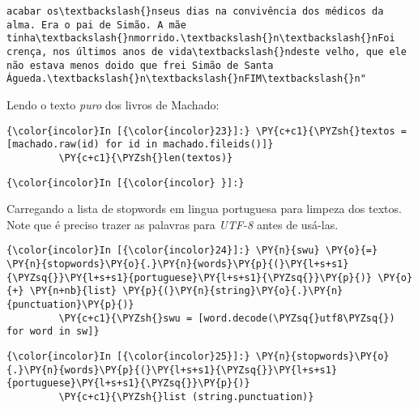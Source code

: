 \begin{Verbatim}[commandchars=\\\{\}]
acabar os\textbackslash{}nseus dias na convivência dos médicos da alma. Era o pai de Simão. A mãe tinha\textbackslash{}nmorrido.\textbackslash{}n\textbackslash{}nFoi crença, nos últimos anos de vida\textbackslash{}ndeste velho, que ele não estava menos doido que frei Simão de Santa Águeda.\textbackslash{}n\textbackslash{}nFIM\textbackslash{}n"
\end{Verbatim}
        
    Lendo o texto \emph{puro} dos livros de Machado:

    \begin{Verbatim}[commandchars=\\\{\}]
{\color{incolor}In [{\color{incolor}23}]:} \PY{c+c1}{\PYZsh{}textos = [machado.raw(id) for id in machado.fileids()]}
         \PY{c+c1}{\PYZsh{}len(textos)}
\end{Verbatim}

    \begin{Verbatim}[commandchars=\\\{\}]
{\color{incolor}In [{\color{incolor} }]:} 
\end{Verbatim}

    Carregando a lista de stopwords em lingua portuguesa para limpeza dos
textos. Note que é preciso trazer as palavras para \emph{UTF-8} antes de
usá-las.

    \begin{Verbatim}[commandchars=\\\{\}]
{\color{incolor}In [{\color{incolor}24}]:} \PY{n}{swu} \PY{o}{=} \PY{n}{stopwords}\PY{o}{.}\PY{n}{words}\PY{p}{(}\PY{l+s+s1}{\PYZsq{}}\PY{l+s+s1}{portuguese}\PY{l+s+s1}{\PYZsq{}}\PY{p}{)} \PY{o}{+} \PY{n+nb}{list} \PY{p}{(}\PY{n}{string}\PY{o}{.}\PY{n}{punctuation}\PY{p}{)}
         \PY{c+c1}{\PYZsh{}swu = [word.decode(\PYZsq{}utf8\PYZsq{}) for word in sw]}
\end{Verbatim}

    \begin{Verbatim}[commandchars=\\\{\}]
{\color{incolor}In [{\color{incolor}25}]:} \PY{n}{stopwords}\PY{o}{.}\PY{n}{words}\PY{p}{(}\PY{l+s+s1}{\PYZsq{}}\PY{l+s+s1}{portuguese}\PY{l+s+s1}{\PYZsq{}}\PY{p}{)}
         \PY{c+c1}{\PYZsh{}list (string.punctuation)}
\end{Verbatim}

